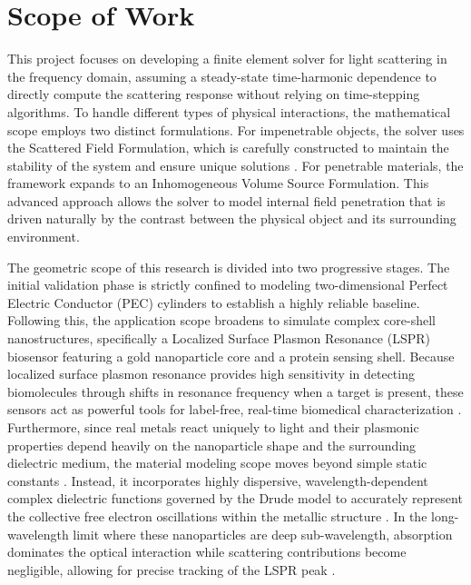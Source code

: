 \documentclass[class=report, crop=false]{standalone}
\begin{document}
\section{Scope of Work}

This project focuses on developing a finite element solver for light scattering in the frequency domain, assuming a steady-state time-harmonic dependence to directly compute the scattering response without relying on time-stepping algorithms. To handle different types of physical interactions, the mathematical scope employs two distinct formulations. For impenetrable objects, the solver uses the Scattered Field Formulation, which is carefully constructed to maintain the stability of the system and ensure unique solutions \citep{Boyse1992, Jiang1996}. For penetrable materials, the framework expands to an Inhomogeneous Volume Source Formulation. This advanced approach allows the solver to model internal field penetration that is driven naturally by the contrast between the physical object and its surrounding environment.

\vspace{12pt}

The geometric scope of this research is divided into two progressive stages. The initial validation phase is strictly confined to modeling two-dimensional Perfect Electric Conductor (PEC) cylinders to establish a highly reliable baseline. Following this, the application scope broadens to simulate complex core-shell nanostructures, specifically a Localized Surface Plasmon Resonance (LSPR) biosensor featuring a gold nanoparticle core and a protein sensing shell. Because localized surface plasmon resonance provides high sensitivity in detecting biomolecules through shifts in resonance frequency when a target is present, these sensors act as powerful tools for label-free, real-time biomedical characterization \citep{PhysRevE.100.063305}. Furthermore, since real metals react uniquely to light and their plasmonic properties depend heavily on the nanoparticle shape and the surrounding dielectric medium, the material modeling scope moves beyond simple static constants \citep{Mayer2011}. Instead, it incorporates highly dispersive, wavelength-dependent complex dielectric functions governed by the Drude model to accurately represent the collective free electron oscillations within the metallic structure \citep{Mayer2011}. In the long-wavelength limit where these nanoparticles are deep sub-wavelength, absorption dominates the optical interaction while scattering contributions become negligible, allowing for precise tracking of the LSPR peak \citep{PhysRevE.100.063305}.
\end{document}
